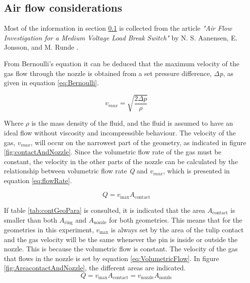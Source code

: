 \documentclass[10pt,a4paper,twoside]{article}
\begin{document}
\subsection{Air flow considerations} \label{sec:AirFlow}
 Most of the information in section \ref{sec:AirFlow} is collected from the article \textit{"Air Flow Investigation for a Medium Voltage Load Break Switch"} by N. S. Aanensen, E. Jonsson, and M. Runde \cite{bib:AFIMVLBA}. \newline

From Bernoulli's equation it can be deduced that the maximum velocity of the gas flow through the nozzle is obtained from a set pressure difference, $\Delta$\textit{p}, as given in equation \eqref{eq:Bernoulli}.

\begin{equation} \label{eq:Bernoulli}
v_{max}=\sqrt{ \frac{2 \Delta p}{\rho}}
\end{equation}

Where $\rho$ is the mass density of the fluid, and the fluid is assumed to have an ideal flow without viscosity and incompressible behaviour. The velocity of the gas, $v_{max}$, will occur on the narrowest part of the geometry, as indicated in figure \ref{fig:contactAndNozzle}. Since the volumetric flow rate of the gas must be constant, the velocity in the other parts of the nozzle can be calculated by the relationship between volumetric flow rate \textit{Q} and $v_{max}$, which is presented in equation \eqref{eq:flowRate}.

\begin{equation} \label{eq:flowRate}
Q=v_{\mathrm{max}} A_\mathrm{{contact}}
\end{equation} 

If table \ref{tab:contGeoPara} is consulted, it is indicated that the area $ A_\mathrm{{contact}}$ is smaller than both $A_\mathrm{{ring}}$ and $A_\mathrm{{nozzle}}$ for both geometries. This means that for the geometries in this experiment, $v_\mathrm{{max}}$ is always set by the area of the tulip contact and the gas velocity will be the same whenever the pin is inside or outside the nozzle. This is because the volumetric flow is constant. The velocity of the gas that flows in the nozzle is set by equation \eqref{eq:VolumetricFlow}. In figure \ref{fig:AreacontactAndNozzle}, the different areas are indicated.
\begin{equation*}
Q=v_\mathrm{{max}} A_\mathrm{{contact}} = v_\mathrm{{nozzle}} A_\mathrm{{nozzle}}
\end{equation*}
\end{document}
